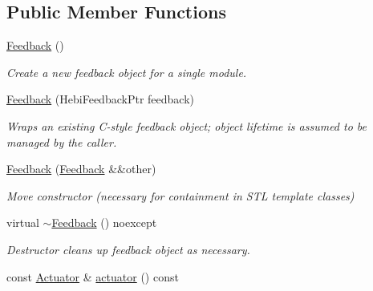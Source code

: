 \subsection*{Public Member Functions}
\begin{DoxyCompactItemize}
\item 
\mbox{\label{classhebi_1_1Feedback_aa24d88a1a9f74231e74d75a09ca3f2d8}} 
\hyperlink{classhebi_1_1Feedback_aa24d88a1a9f74231e74d75a09ca3f2d8}{Feedback} ()
\begin{DoxyCompactList}\small\item\em Create a new feedback object for a single module. \end{DoxyCompactList}\item 
\hyperlink{classhebi_1_1Feedback_a172321e2516f2bca57a1e32d0263bd3f}{Feedback} (Hebi\+Feedback\+Ptr feedback)
\begin{DoxyCompactList}\small\item\em Wraps an existing C-\/style feedback object; object lifetime is assumed to be managed by the caller. \end{DoxyCompactList}\item 
\mbox{\label{classhebi_1_1Feedback_ab2d48835e8c66094b5f058d52d95417f}} 
\hyperlink{classhebi_1_1Feedback_ab2d48835e8c66094b5f058d52d95417f}{Feedback} (\hyperlink{classhebi_1_1Feedback}{Feedback} \&\&other)
\begin{DoxyCompactList}\small\item\em Move constructor (necessary for containment in S\+TL template classes) \end{DoxyCompactList}\item 
\mbox{\label{classhebi_1_1Feedback_a4d4b06211530ace089ec434f0c742b68}} 
virtual \hyperlink{classhebi_1_1Feedback_a4d4b06211530ace089ec434f0c742b68}{$\sim$\+Feedback} () noexcept
\begin{DoxyCompactList}\small\item\em Destructor cleans up feedback object as necessary. \end{DoxyCompactList}\item 
\mbox{\label{classhebi_1_1Feedback_aff289dfea1dde465b30b2b73b1d509e2}} 
const \hyperlink{classhebi_1_1Feedback_1_1Actuator}{Actuator} \& \hyperlink{classhebi_1_1Feedback_aff289dfea1dde465b30b2b73b1d509e2}{actuator} () const

\end{DoxyCompactItemize}
